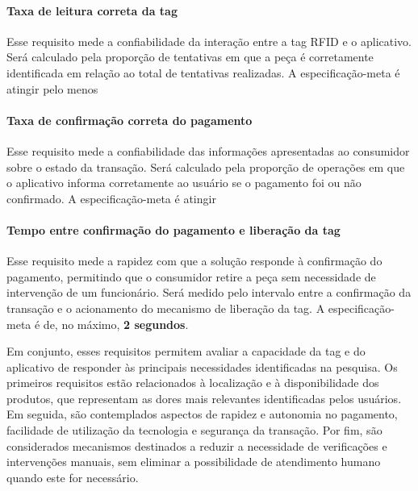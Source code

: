 \paragraph{Taxa de leitura correta da tag}
\label{par:taxa_leitura_tag}

Esse requisito mede a confiabilidade da interação entre a tag RFID e o aplicativo. Será calculado pela proporção de tentativas em que a peça é corretamente identificada em relação ao total de tentativas realizadas. A especificação-meta é atingir pelo menos 

\paragraph{Taxa de confirmação correta do pagamento}
\label{par:taxa_confirmacao_pagamento}

Esse requisito mede a confiabilidade das informações apresentadas ao consumidor sobre o estado da transação. Será calculado pela proporção de operações em que o aplicativo informa corretamente ao usuário se o pagamento foi ou não confirmado. A especificação-meta é atingir 
 

\paragraph{Tempo entre confirmação do pagamento e liberação da tag}
\label{par:tempo_liberacao_tag}

Esse requisito mede a rapidez com que a solução responde à confirmação do pagamento, permitindo que o consumidor retire a peça sem necessidade de intervenção de um funcionário. Será medido pelo intervalo entre a confirmação da transação e o acionamento do mecanismo de liberação da tag. A especificação-meta é de, no máximo, \textbf{2 segundos}.


\vspace{10mm}


Em conjunto, esses requisitos permitem avaliar a capacidade da tag e do aplicativo de responder às principais necessidades identificadas na pesquisa. Os primeiros requisitos estão relacionados à localização e à disponibilidade dos produtos, que representam as dores mais relevantes identificadas pelos usuários. Em seguida, são contemplados aspectos de rapidez e autonomia no pagamento, facilidade de utilização da tecnologia e segurança da transação. Por fim, são considerados mecanismos destinados a reduzir a necessidade de verificações e intervenções manuais, sem eliminar a possibilidade de atendimento humano quando este for necessário.



